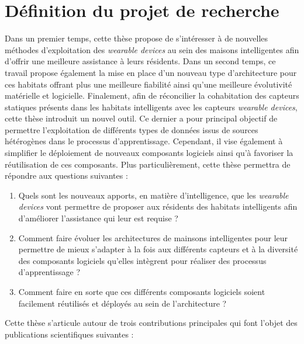 {{\section{Définition du projet de recherche}
\label{sec:def_proj}

Dans un premier temps, cette thèse propose de s'intéresser à de nouvelles méthodes d'exploitation des \textit{wearable devices} au sein des maisons intelligentes afin d'offrir une meilleure assistance à leurs résidents. Dans un second temps, ce travail propose également la mise en place d'un nouveau type d'architecture pour ces habitats offrant plus une meilleure fiabilité ainsi qu'une meilleure évolutivité matérielle et logicielle. Finalement, afin de réconcilier la cohabitation des capteurs statiques présents dans les habitats intelligents avec les capteurs \textit{wearable devices}, cette thèse introduit un nouvel outil. Ce dernier a pour principal objectif de permettre l'exploitation de différents types de données issus de sources hétérogènes dans le processus d'apprentissage. Cependant, il vise également à simplifier le déploiement de nouveaux composants logiciels ainsi qu'à favoriser la réutilisation de ces composants. Plus particulièrement, cette thèse permettra de répondre aux questions suivantes :

\begin{enumerate}
	\item
		\label{question:1}
		Quels sont les nouveaux apports, en matière d'intelligence, que les \textit{wearable devices} vont permettre de proposer aux résidents des habitats intelligents afin d'améliorer l'assistance qui leur est requise ?
	\item
		\label{question:2}
		Comment faire évoluer les architectures de mainsons intelligentes pour leur permettre de mieux s'adapter à la fois aux différents capteurs et à la diversité des composants logiciels qu'elles intègrent pour réaliser des processus d'apprentissage ?
	\item
		\label{question:3}
		Comment faire en sorte que ces différents composants logiciels soient facilement réutilisés et déployés au sein de l'architecture ?
\end{enumerate}

Cette thèse s'articule autour de trois contributions principales qui font l'objet des publications scientifiques suivantes :

}}

